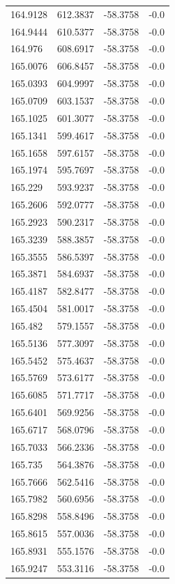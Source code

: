 \begin{table}[H]
\begin{tabular}{llll}
164.9128 & 612.3837 & -58.3758 & -0.0 \\
164.9444 & 610.5377 & -58.3758 & -0.0 \\
164.976 & 608.6917 & -58.3758 & -0.0 \\
165.0076 & 606.8457 & -58.3758 & -0.0 \\
165.0393 & 604.9997 & -58.3758 & -0.0 \\
165.0709 & 603.1537 & -58.3758 & -0.0 \\
165.1025 & 601.3077 & -58.3758 & -0.0 \\
165.1341 & 599.4617 & -58.3758 & -0.0 \\
165.1658 & 597.6157 & -58.3758 & -0.0 \\
165.1974 & 595.7697 & -58.3758 & -0.0 \\
165.229 & 593.9237 & -58.3758 & -0.0 \\
165.2606 & 592.0777 & -58.3758 & -0.0 \\
165.2923 & 590.2317 & -58.3758 & -0.0 \\
165.3239 & 588.3857 & -58.3758 & -0.0 \\
165.3555 & 586.5397 & -58.3758 & -0.0 \\
165.3871 & 584.6937 & -58.3758 & -0.0 \\
165.4187 & 582.8477 & -58.3758 & -0.0 \\
165.4504 & 581.0017 & -58.3758 & -0.0 \\
165.482 & 579.1557 & -58.3758 & -0.0 \\
165.5136 & 577.3097 & -58.3758 & -0.0 \\
165.5452 & 575.4637 & -58.3758 & -0.0 \\
165.5769 & 573.6177 & -58.3758 & -0.0 \\
165.6085 & 571.7717 & -58.3758 & -0.0 \\
165.6401 & 569.9256 & -58.3758 & -0.0 \\
165.6717 & 568.0796 & -58.3758 & -0.0 \\
165.7033 & 566.2336 & -58.3758 & -0.0 \\
165.735 & 564.3876 & -58.3758 & -0.0 \\
165.7666 & 562.5416 & -58.3758 & -0.0 \\
165.7982 & 560.6956 & -58.3758 & -0.0 \\
165.8298 & 558.8496 & -58.3758 & -0.0 \\
165.8615 & 557.0036 & -58.3758 & -0.0 \\
165.8931 & 555.1576 & -58.3758 & -0.0 \\
165.9247 & 553.3116 & -58.3758 & -0.0 \\

\end{tabular}
\end{table}
